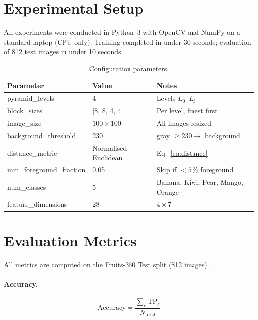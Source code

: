 \documentclass[11pt,a4paper]{article}
\begin{document}
\section{Experimental Setup}

All experiments were conducted in Python~3 with OpenCV and NumPy
\citep{harris2020array,bradski2000opencv} on a standard laptop (CPU only).
Training completed in under 30 seconds; evaluation of 812 test images in
under 10 seconds.

\begin{table}[H]
  \centering
  \caption{Configuration parameters.}
  \label{tab:config}
  \begin{tabular}{@{}lll@{}}
    \toprule
    \textbf{Parameter} & \textbf{Value} & \textbf{Notes} \\
    \midrule
    pyramid\_levels         & 4             & Levels $L_0$--$L_3$ \\
    block\_sizes            & [8, 8, 4, 4]  & Per level, finest first \\
    image\_size             & $100\times100$ & All images resized \\
    background\_threshold   & 230           & gray $\geq 230 \to$ background \\
    distance\_metric        & Normalised Euclidean & Eq.~\eqref{eq:distance} \\
    min\_foreground\_fraction & 0.05        & Skip if $<5\,\%$ foreground \\
    num\_classes            & 5             & Banana, Kiwi, Pear, Mango, Orange \\
    feature\_dimensions     & 28            & $4 \times 7$ \\
    \bottomrule
  \end{tabular}
\end{table}

\section{Evaluation Metrics}

All metrics are computed on the Fruits-360 Test split (812 images).

\paragraph{Accuracy.}
\[
  \text{Accuracy} = \frac{\sum_c \mathrm{TP}_c}{N_{\text{total}}}
\]
\end{document}
